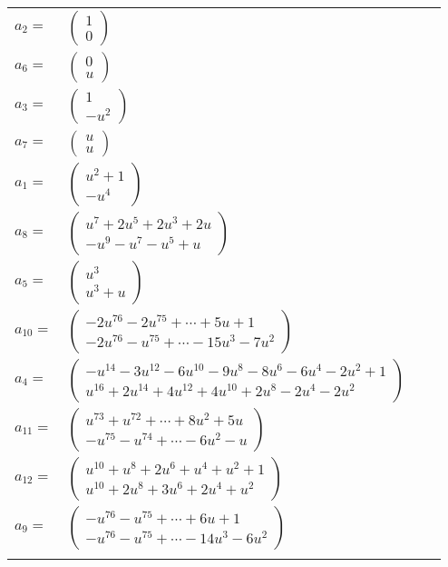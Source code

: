 \documentclass[1p]{elsarticle_modified}
\theoremstyle{definition}
\begin{document}
\begin{tabular}{m{7pt} m{180pt} m{7pt} m{180pt} }
\flushright $a_{2}=$&$\begin{pmatrix}1\\0\end{pmatrix}$ \\
\flushright $a_{6}=$&$\begin{pmatrix}0\\u\end{pmatrix}$ \\
\flushright $a_{3}=$&$\begin{pmatrix}1\\- u^2\end{pmatrix}$ \\
\flushright $a_{7}=$&$\begin{pmatrix}u\\u\end{pmatrix}$ \\
\flushright $a_{1}=$&$\begin{pmatrix}u^2+1\\- u^4\end{pmatrix}$ \\
\flushright $a_{8}=$&$\begin{pmatrix}u^7+2 u^5+2 u^3+2 u\\- u^9- u^7- u^5+u\end{pmatrix}$ \\
\flushright $a_{5}=$&$\begin{pmatrix}u^3\\u^3+u\end{pmatrix}$ \\
\flushright $a_{10}=$&$\begin{pmatrix}-2 u^{76}-2 u^{75}+\cdots+5 u+1\\-2 u^{76}- u^{75}+\cdots-15 u^3-7 u^2\end{pmatrix}$ \\
\flushright $a_{4}=$&$\begin{pmatrix}- u^{14}-3 u^{12}-6 u^{10}-9 u^8-8 u^6-6 u^4-2 u^2+1\\u^{16}+2 u^{14}+4 u^{12}+4 u^{10}+2 u^8-2 u^4-2 u^2\end{pmatrix}$ \\
\flushright $a_{11}=$&$\begin{pmatrix}u^{73}+u^{72}+\cdots+8 u^2+5 u\\- u^{75}- u^{74}+\cdots-6 u^2- u\end{pmatrix}$ \\
\flushright $a_{12}=$&$\begin{pmatrix}u^{10}+u^8+2 u^6+u^4+u^2+1\\u^{10}+2 u^8+3 u^6+2 u^4+u^2\end{pmatrix}$ \\
\flushright $a_{9}=$&$\begin{pmatrix}- u^{76}- u^{75}+\cdots+6 u+1\\- u^{76}- u^{75}+\cdots-14 u^3-6 u^2\end{pmatrix}$\\&\end{tabular}
\end{document}

